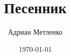 \documentclass[14pt]{extreport}
\title{Песенник}
\author{Адриан Метленко}
\date{\today}
\begin{document}
\maketitle
\clearpage

\hypertarget{toc}{}
\tableofcontents
\clearpage
\pagestyle{fancy}



\clearpage
\hypertarget{artists}{}
\printindex[artists]

\clearpage
\hypertarget{composers}{}
\printindex[composers]

\clearpage
\hypertarget{lyricists}{}
\printindex[lyricists]
\end{document}
